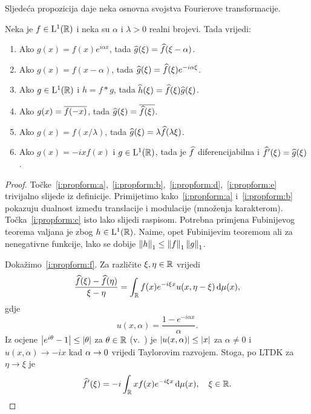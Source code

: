 \documentclass[main.tex]{subfiles}
\begin{document}
Sljedeća propozicija daje neka osnovna svojstva Fourierove transformacije.

\begin{propozicija}\label{prop:form}
	Neka je \( f \in \mathrm{L}^1(\mathbb{R}) \) i neka su
	\( \alpha \) i \( \lambda > 0\) realni brojevi. Tada vrijedi:
	\begin{enumerate}[label=(\roman*)]
		\item Ako \( g(x)=f(x)e^{i\alpha x} \), tada \( \widehat{g}(\xi) = \widehat{f}(\xi-\alpha) \).\label{i:propform:a}
		\item Ako \( g(x)=f(x-\alpha) \), tada \( \widehat{g}(\xi) = \widehat{f}(\xi)e^{-i \alpha \xi} \).\label{i:propform:b}
		\item Ako \( g \in \mathrm{L}^1(\mathbb{R}) \) i \( h = f*g \), tada \( \widehat{h}(\xi) = \widehat{f}(\xi) \widehat{g}(\xi) \).\label{i:propform:c}
		\item Ako \( g(x) = \overline{f(-x)} \), tada \( \widehat{g}(\xi) = \overline{\widehat{f}(\xi)} \).\label{i:propform:d}
		\item Ako \( g(x) = f(x/\lambda) \), tada \( \widehat{g}(\xi) = \lambda \widehat{f}(\lambda\xi) \).\label{i:propform:e}
		\item Ako \( g(x) = -ixf(x) \) i \( g \in \mathrm{L}^1(\mathbb{R}) \),
		      tada je \( \widehat{f} \) diferencijabilna i \( \widehat{f}'(\xi) = \widehat{g}(\xi) \).\label{i:propform:f}
	\end{enumerate}
\end{propozicija}

\begin{proof}
	Točke~\ref{i:propform:a},~\ref{i:propform:b},~\ref{i:propform:d},~\ref{i:propform:e}
	trivijalno slijede iz definicije. Primijetimo kako~\ref{i:propform:a} i~\ref{i:propform:b}
	pokazuju dualnost između translacije i modulacije (množenja karakterom).
	Točka~\ref{i:propform:c} isto lako slijedi raspisom. Potrebna primjena Fubinijevog teorema
	valjana je zbog \( h \in \mathrm{L}^1(\mathbb{R}) \). Naime, opet Fubinijevim teoremom ali za
	nenegativne funkcije, lako se dobije \( \left\lVert h\right\rVert_1 \le \left\lVert f\right\rVert_1 \left\lVert g\right\rVert_1 \).

	Dokažimo~\ref{i:propform:f}. Za različite \( \xi, \eta \in \mathbb{R} \) vrijedi
	\begin{equation}
		\frac{\widehat{f}(\xi)-\widehat{f}(\eta)}{\xi-\eta} =
		\int_{\mathbb{R}} f(x) e^{-i\xi x} u(x, \eta-\xi) \,\mathrm d \mu(x),
	\end{equation}
	gdje
	\begin{equation}
		u(x, \alpha) = \frac{1-e^{-i\alpha x}}{\alpha}.
	\end{equation}
	Iz ocjene \( \left| {e^{i\theta}-1} \right| \le \left| {\theta} \right| \) za \( \theta \in \mathbb{R} \)
	(v.~\cite[str.~514.]{sarapa}) je \( \left| {u(x, \alpha)} \right| \le \left| {x} \right| \) za
	\( \alpha \neq 0 \) i
	\( u(x, \alpha) \rightarrow -ix \) kad \( \alpha \rightarrow 0 \) vrijedi
	Taylorovim razvojem. Stoga, po LTDK za \( \eta \rightarrow \xi \) je
	\begin{equation}
		\widehat{f}'(\xi) = -i \int_{\mathbb{R}} xf(x) e^{-i \xi x} \,\mathrm d \mu (x), \quad \xi \in \mathbb{R}.
	\end{equation}
\end{proof}
\end{document}
